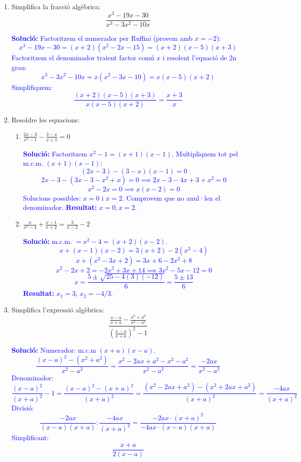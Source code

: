 \documentclass[12pt,a4paper]{article}
\newcommand{\solucio}[1]{%
    \par\vspace{5pt}\noindent\textcolor{blue}{\textbf{Solució:} #1}\par\vspace{10pt}%
}
\begin{document}
\begin{enumerate}[label=\textbf{\arabic*.}]
    
    \item Simplifica la fracció algèbrica:
    \[ \frac{x^{3}-19x-30}{x^{3}-3x^{2}-10x} \]
    
    \solucio{
    Factoritzem el numerador per Ruffini (provem amb $x=-2$):
    \[ x^3 - 19x - 30 = (x+2)(x^2-2x-15) = (x+2)(x-5)(x+3) \]
    Factoritzem el denominador traient factor comú $x$ i resolent l'equació de 2n grau:
    \[ x^3 - 3x^2 - 10x = x(x^2 - 3x - 10) = x(x-5)(x+2) \]
    Simplifiquem:
    \[ \frac{(x+2)(x-5)(x+3)}{x(x-5)(x+2)} = \boxed{\frac{x+3}{x}} \]
    }

    \item Resoldre les equacions:
    \begin{enumerate}[label=\alph*)]
        \item $\displaystyle \frac{2x-3}{x^{2}-1}-\frac{3-x}{x+1}=0$
        
        \solucio{
        Factoritzem $x^2-1 = (x+1)(x-1)$. Multipliquem tot pel m.c.m. $(x+1)(x-1)$:
        \[ (2x-3) - (3-x)(x-1) = 0 \]
        \[ 2x-3 - (3x - 3 - x^2 + x) = 0 \implies 2x - 3 - 4x + 3 + x^2 = 0 \]
        \[ x^2 - 2x = 0 \implies x(x-2) = 0 \]
        Solucions possibles: $x=0$ i $x=2$. Comprovem que no anul·len el denominador.
        \textbf{Resultat:} $x=0, x=2$.
        }

        \item $\displaystyle \frac{x}{x^{2}-4}+\frac{x-1}{x+2}=\frac{3}{x-2}-2$
        
        \solucio{
        m.c.m. $= x^2-4 = (x+2)(x-2)$.
        \[ x + (x-1)(x-2) = 3(x+2) - 2(x^2-4) \]
        \[ x + (x^2 - 3x + 2) = 3x + 6 - 2x^2 + 8 \]
        \[ x^2 - 2x + 2 = -2x^2 + 3x + 14 \implies 3x^2 - 5x - 12 = 0 \]
        \[ x = \frac{5 \pm \sqrt{25 - 4(3)(-12)}}{6} = \frac{5 \pm 13}{6} \]
        \textbf{Resultat:} $x_1 = 3$, $x_2 = -4/3$.
        }
    \end{enumerate}

    \item Simplifica l'expressió algèbrica:
    \[ \frac{\frac{x-a}{x+a}-\frac{x^{2}+a^{2}}{x^{2}-a^{2}}}{\left(\frac{x-a}{x+a}\right)^{2}-1} \]
    
    \solucio{
    Numerador: m.c.m $(x+a)(x-a)$.
    \[ \frac{(x-a)^2 - (x^2+a^2)}{x^2-a^2} = \frac{x^2-2ax+a^2-x^2-a^2}{x^2-a^2} = \frac{-2ax}{x^2-a^2} \]
    Denominador:
    \[ \frac{(x-a)^2}{(x+a)^2} - 1 = \frac{(x-a)^2 - (x+a)^2}{(x+a)^2} = \frac{(x^2-2ax+a^2) - (x^2+2ax+a^2)}{(x+a)^2} = \frac{-4ax}{(x+a)^2} \]
    Divisió:
    \[ \frac{-2ax}{(x-a)(x+a)} : \frac{-4ax}{(x+a)^2} = \frac{-2ax \cdot (x+a)^2}{-4ax \cdot (x-a)(x+a)} \]
    Simplificant:
    \[ \boxed{\frac{x+a}{2(x-a)}} \]
    }


\end{enumerate}
\end{document}

